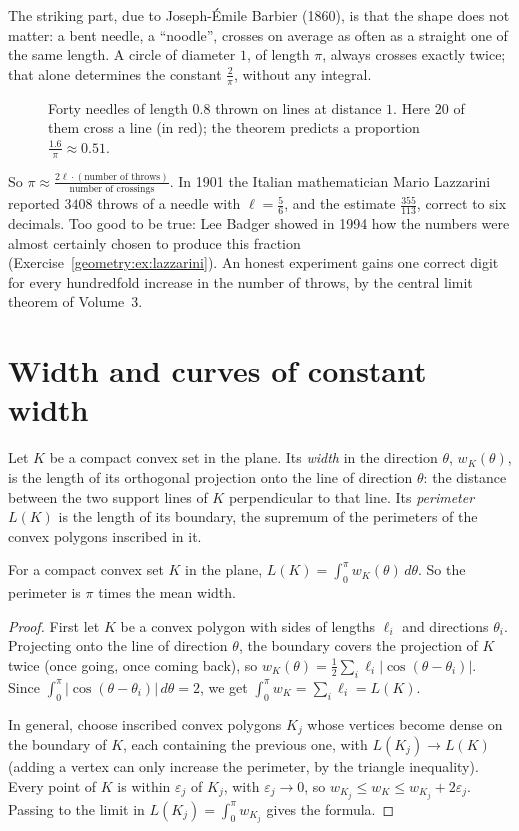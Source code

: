 The striking part, due to Joseph-\'Emile Barbier (1860), is that the shape does not matter: a bent needle, a ``noodle'', crosses on average as often as a
straight one of the same length. A circle of diameter $1$, of length $\pi$, always crosses exactly twice; that alone determines the constant
$\frac2\pi$, without any integral.

\begin{figure}[ht]
\centering
{}
\caption{Forty needles of length $0.8$ thrown on lines at distance $1$. Here $20$ of them cross a line (in red); the theorem predicts a proportion
$\frac{1.6}\pi\approx0.51$.}
\label{geometry:fig:buffon}
\end{figure}

So $\pi\approx\frac{2\ell\cdot(\text{number of throws})}{\text{number of crossings}}$. In 1901 the Italian mathematician Mario Lazzarini reported $3408$ throws of a
needle with $\ell=\frac56$, and the estimate $\frac{355}{113}$, correct to six decimals. Too good to be true: Lee Badger showed in 1994 how the numbers were
almost certainly chosen to produce this fraction (Exercise~\ref{geometry:ex:lazzarini}). An honest experiment gains one correct digit for every hundredfold increase in
the number of throws, by the central limit theorem of Volume~3.

\section{Width and curves of constant width}

Let $K$ be a compact convex set in the plane. Its \emph{width} in the direction $\theta$, $w_K(\theta)$, is the length of its orthogonal projection onto the
line of direction $\theta$: the distance between the two support lines of $K$ perpendicular to that line. Its \emph{perimeter} $L(K)$ is the length of its
boundary, the supremum of the perimeters of the convex polygons inscribed in it.

\begin{theorem}\label{geometry:thm:cauchy}
For a compact convex set $K$ in the plane, $L(K)=\int_0^\pi w_K(\theta)\,d\theta$. So the perimeter is $\pi$ times the mean width.
\end{theorem}

\begin{proof}
First let $K$ be a convex polygon with sides of lengths $\ell_i$ and directions $\theta_i$. Projecting onto the line of direction $\theta$, the boundary covers the
projection of $K$ twice (once going, once coming back), so $w_K(\theta)=\frac12\sum_i\ell_i|\cos(\theta-\theta_i)|$. Since
$\int_0^\pi|\cos(\theta-\theta_i)|\,d\theta=2$, we get $\int_0^\pi w_K=\sum_i\ell_i=L(K)$.

In general, choose inscribed convex polygons $K_j$ whose vertices become dense on the boundary of $K$, each containing the previous one, with
$L(K_j)\to L(K)$ (adding a vertex can only increase the perimeter, by the triangle inequality). Every point of $K$ is within $\varepsilon_j$ of $K_j$, with
$\varepsilon_j\to0$, so $w_{K_j}\le w_K\le w_{K_j}+2\varepsilon_j$. Passing to the limit in $L(K_j)=\int_0^\pi w_{K_j}$ gives the formula.
\end{proof}


